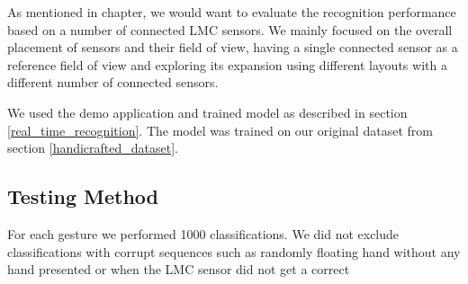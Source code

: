 As mentioned in  chapter, we would want to evaluate the recognition performance based on a number of connected LMC sensors. We mainly focused on the overall placement of sensors and their field of view, having a single connected sensor as a reference field of view and exploring its expansion using different layouts with a different number of connected sensors. 

We used the demo application and trained model as described in section \ref{real_time_recognition}. The model was trained on our original dataset from section \ref{handicrafted_dataset}. 

\subsection{Testing Method}

For each gesture we performed 1000 classifications. We did not exclude classifications with corrupt sequences such as randomly floating hand without any hand presented or when the LMC sensor did not get a correct
